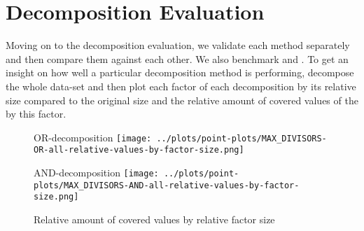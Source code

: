 \section{Decomposition Evaluation}
Moving on to the decomposition evaluation, we validate each method separately and then compare them against each other.
We also benchmark \andDecomp and \orDecomp.
To get an insight on how well a particular decomposition method is performing, decompose the whole data-set and then plot each factor of each decomposition by its relative size compared to the original \DFA size and the relative amount of covered values of the \DFA by this factor.
\begin{figure}[t]
	\begin{minipage}[h]{0.49\linewidth}
		\centering
		OR-decomposition
		\texttt{[image: ../plots/point-plots/MAX\_DIVISORS-OR-all-relative-values-by-factor-size.png]}
	\end{minipage}
	\begin{minipage}[h]{0.49\linewidth}
		\centering
		AND-decomposition
		\texttt{[image: ../plots/point-plots/MAX\_DIVISORS-AND-all-relative-values-by-factor-size.png]}
	\end{minipage}
	\caption{Relative amount of covered values by relative factor size}
	\label{fig:eval:max-divisor-all-factors}
\end{figure}

